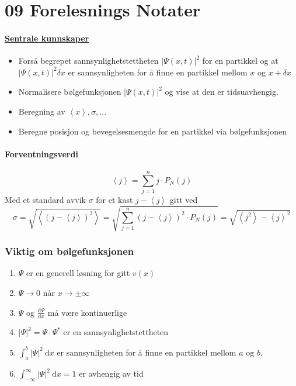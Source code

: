 \section{09 Forelesnings Notater}
\paragraph{\underline{Sentrale kunnskaper}}
\begin{itemize}
    \item Forså begrepet sannsynlighetstettheten $\left| Ψ(x,t) \right| ^2$ for en partikkel og at $\left| Ψ(x,t) \right| ^2 δx$ er sannsynligheten for å finne en partikkel mellom $x$ og $x + δx$
    \item Normalisere bølgefunksjonen $\left| Ψ(x,t) \right| ^2$ og vise at den er tidsuavhengig. 
    \item Beregning av $\left< x \right>, σ,...$
    \item Beregne posisjon og bevegelsesmengde for en partikkel via bølgefunksjonen
\end{itemize}

\paragraph{Forventningsverdi}
\[
\left< j \right> = ∑_{j=1}^{n} j ⋅ P_N(j)
\]
Med et standard avvik $σ$ for et kast $j - \left< j \right>$ gitt ved
\[
σ = \sqrt{\left<\left(j - \left<j\right>\right)^2\right>} = \sqrt{∑_{j=1}^{n} \left(j - \left<j\right>\right)^2 ⋅ P_N(j)} = \sqrt{\left<j^2\right> - \left<j\right>^2}
\]
\subsubsection*{Viktig om bølgefunksjonen}
\begin{enumerate}
    \item $Ψ$ er en generell løsning for gitt $v(x)$
    \item $Ψ → 0$ når $x → ± ∞$
    \item $Ψ$ og $\frac{\mathrm{d}Ψ}{\mathrm{d}x}$ må være kontinuerlige
    \item $\left| Ψ \right| ^2 = Ψ ⋅ Ψ^{*}$ er en sannsynlighetstettheten
    \item $∫_{a}^{b} \left| Ψ \right| ^2 \ \mathrm{d}x$ er sannsynligheten for å finne en partikkel mellom $a$ og $b$. 
    \item $∫_{-∞}^{∞} \left| Ψ \right| ^2 \ \mathrm{d}x = 1$ er avhengig av tid
\end{enumerate}

